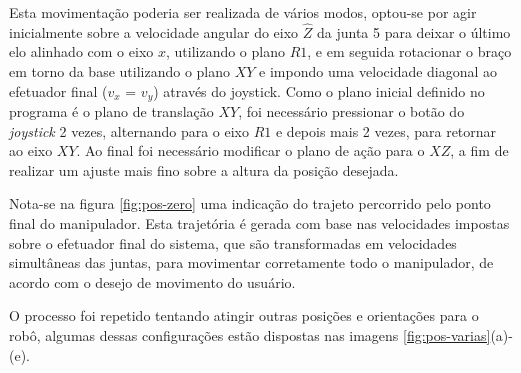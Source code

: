 Esta movimentação poderia ser realizada de vários modos, optou-se por agir inicialmente sobre a 
velocidade angular do eixo $\hat{Z}$ da junta 5 para deixar o último elo alinhado com o eixo $x$, utilizando o plano $R1$, e em 
seguida rotacionar o braço em torno da base utilizando o plano $XY$ e impondo uma velocidade
diagonal ao efetuador final ($v_x$ = $v_y$) através do joystick. 
Como o plano inicial definido no programa é o plano de translação $XY$,
foi necessário pressionar o botão do \textit{joystick} 2 vezes, alternando para o eixo $R1$ e depois mais
2 vezes, para retornar ao eixo $XY$. Ao final foi necessário modificar o plano de ação para o $XZ$, 
a fim de realizar um ajuste mais fino sobre a altura da posição desejada.

Nota-se na figura \ref{fig:pos-zero} uma indicação do trajeto percorrido pelo ponto final do 
manipulador. Esta trajetória é gerada com base nas velocidades impostas sobre o efetuador
final do sistema, que são transformadas em velocidades simultâneas das juntas, para movimentar corretamente
todo o manipulador, de acordo com o desejo de movimento do usuário.

O processo foi repetido tentando atingir outras posições e orientações para o robô, algumas dessas
configurações estão dispostas nas imagens \ref{fig:pos-varias}(a)-(e).

